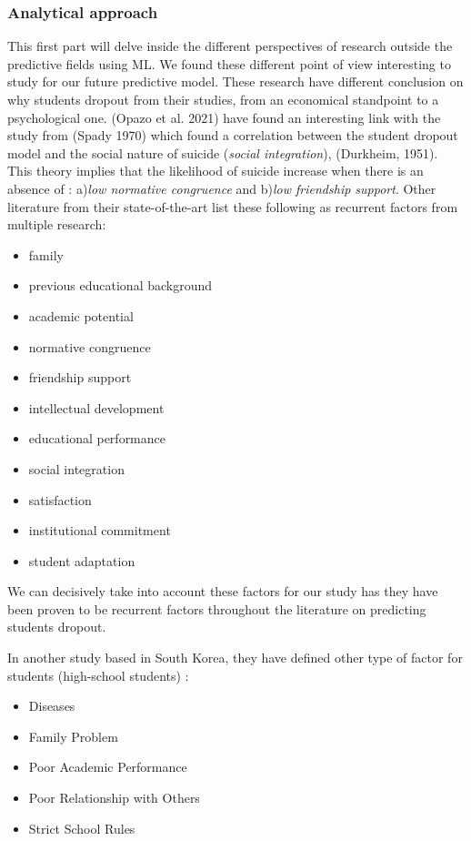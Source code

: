 \documentclass[conference]{IEEEtran}
\begin{document}
\subsubsection{Analytical approach}
\label{subsec:soa_analyticalapproeach}
This first part will delve inside the different perspectives of research outside the predictive fields using ML. We found these different point of view interesting to study for our future predictive model. These research have different conclusion on why students dropout from their studies, from an economical standpoint to a psychological one.
(Opazo et al. 2021)\cite{opazo_analysis_2021} have found an interesting link with the study from (Spady 1970) which found a correlation between the student dropout model and the social nature of suicide (\textit{social integration}), (Durkheim, 1951). This theory implies that the likelihood of suicide increase when there is an absence of : a)\textit{low normative congruence} and b)\textit{low friendship support}. Other literature from their state-of-the-art list these following as recurrent factors from multiple research\cite{opazo_analysis_2021}\cite{spady_dropouts_1970,tinto_dropout_1975,caspersen_teachers_2015,lidia_problema_2006,bejarano_caso_2017,sinchi_acceso_2018,cavero_voluntad_2011,velasco_alisis_nodate}: 
\begin{itemize}
    \item family
    \item previous educational background
    \item academic potential
    \item normative congruence
    \item friendship support
    \item intellectual development
    \item educational performance
    \item social integration
    \item satisfaction
    \item institutional commitment
    \item student adaptation
\end{itemize}
We can decisively take into account these factors for our study has they have been proven to be recurrent factors throughout the literature on predicting students dropout.

In another study based in South Korea, they have defined other type of factor for students (high-school students) \cite{lee_machine_2019} :
\begin{itemize}
    \item Diseases
    \item Family Problem
    \item Poor Academic Performance
    \item Poor Relationship with Others
    \item Strict School Rules
\end{itemize}
\end{document}
